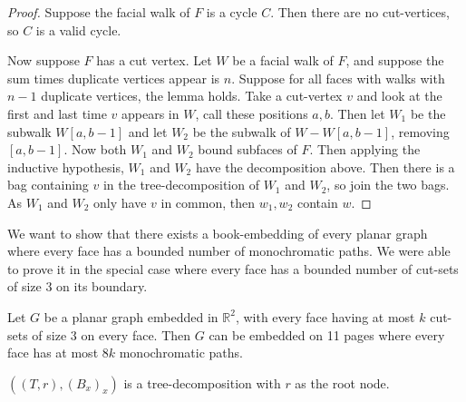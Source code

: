 \begin{proof}
	Suppose the facial walk of $F$ is a cycle $C$. Then there are no cut-vertices, so $C$ is a valid cycle.

	Now suppose $F$ has a cut vertex. Let $W$ be a facial walk of $F$, and suppose the sum times duplicate vertices appear is $n$. Suppose for all faces with walks with $n-1$ duplicate vertices, the lemma holds. Take a cut-vertex $v$ and look at the first and last time $v$ appears in $W$, call these positions $a, b$. Then let $W_1$ be the subwalk $W[a, b-1]$ and let $W_2$ be the subwalk of $W - W[a, b-1]$, removing $[a, b-1]$. Now both $W_1$ and $W_2$ bound subfaces of $F$. Then applying the inductive hypothesis, $W_1$ and $W_2$ have the decomposition above. Then there is a bag containing $v$ in the tree-decomposition of $W_1$ and $W_2$, so join the two bags. As $W_1$ and $W_2$ only have $v$ in common, then $w_1, w_2$ contain $w$. 
\end{proof}

We want to show that there exists a book-embedding of every planar graph where every face has a bounded number of monochromatic paths. We were able to prove it in the special case where every face has a bounded number of cut-sets of size 3 on its boundary.

\begin{theorem}\label{thm:planar_graph__be_mono_paths}
	Let \( G \) be a planar graph embedded in $\mathbb{R}^2$, with every face having at most $k$ cut-sets of size $3$ on every face. Then $G$ can be embedded on 11 pages where every face has at most $8k$ monochromatic paths. 
\end{theorem}

$ ((T,r), (B_x)_x)$ is a tree-decomposition with $r$ as the root node. 

